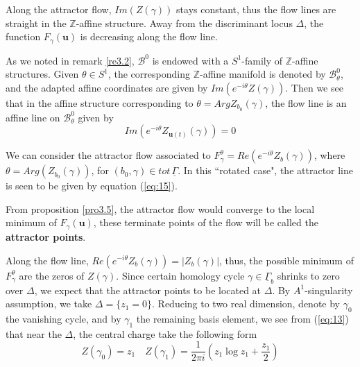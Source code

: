 \documentclass{article}
\begin{document}
\begin{proposition}\label{pro3.5}
Along the attractor flow, $Im(Z({\gamma}))$ stays constant, thus the flow lines are straight in the $\mathbb{Z}$-affine structure. Away from the discriminant locus $\Delta$, the function $F_{\gamma}(\mathbf{u})$ is decreasing along the flow line.
\end{proposition}

As we noted in remark \ref{re3.2}, $\mathcal{B}^{0}$ is endowed with a $S^{1}$-family of $\mathbb{Z}$-affine structures. Given $\theta\in S^{1}$, the corresponding $\mathbb{Z}$-affine manifold is denoted by $\mathcal{B}^{0}_{\theta}$, and the adapted affine coordinates are given by $Im\left(e^{-i\theta}Z(\gamma)\right)$. Then we see that in the affine structure corresponding to $\theta=Arg Z_{b_{0}}(\gamma)$, the flow line is an affine line on $\mathcal{B}^{0}_{\theta}$ given by 
\begin{equation}\label{eq:15}
Im\left(e^{-i\theta}Z_{\mathbf{u}(t)}(\gamma)\right)=0
\end{equation}


\begin{remark}
We can consider the attractor flow associated to $F_{\gamma}^{\theta}=Re\left(e^{-i\theta}Z_{b}(\gamma)\right)$, where $\theta=Arg(Z_{b_{0}}(\gamma))$, for $(b_{0},\gamma)\in tot\,\underline{\Gamma}$. In this ``rotated case", the attractor line is seen to be given by equation (\ref{eq:15}).
\end{remark}

\begin{definition}\label{def:3.4}
From proposition \ref{pro3.5}, the attractor flow would converge to the local minimum of $F_{\gamma}(\mathbf{u})$, these terminate points of the flow will be called the \textbf{attractor points}.
\end{definition}

Along the flow line, $Re\left(e^{-i\theta}Z_{b}(\gamma)\right)=|Z_{b}(\gamma)|$, thus, the possible minimum of $F_{\gamma}^{\theta}$ are the zeros of $Z(\gamma)$. Since certain homology cycle $\gamma\in\underline{\Gamma}_{b}$ shrinks to zero over $\Delta$, we expect that the attractor points to be located at $\Delta$. By $A^{1}$-singularity assumption, we take $\Delta=\{z_{1}=0\}$. Reducing to two real dimension, denote by $\gamma_{0}$ the vanishing cycle, and by $\gamma_{1}$ the remaining basis element, we see from (\ref{eq:13}) that near the $\Delta$, the central charge take the following form \[Z(\gamma_{0})=z_{1}\,\,\,\,\,\,Z(\gamma_{1})=\frac{1}{2\pi i}\left(z_{1}\log z_{1}+\frac{z_{1}}{2}\right)\]
\end{document}
